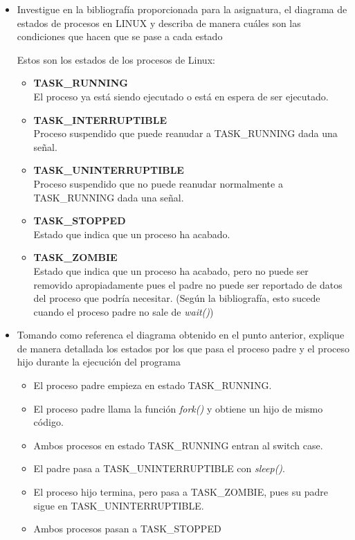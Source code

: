 	\begin{itemize}

		\item Investigue en la bibliografía proporcionada para la asignatura, el diagrama de estados de procesos en LINUX y describa de manera cuáles son las condiciones que hacen que se pase a cada estado
		
	\begin{tcolorbox}
	
	Estos son los estados de los procesos de Linux\cite{o'reilly}:
	\begin{itemize}
	\item \textbf{TASK\_RUNNING}\\
	El proceso ya está siendo ejecutado o está en espera de ser ejecutado.
	\item \textbf{TASK\_INTERRUPTIBLE}\\
	Proceso suspendido que puede reanudar a TASK\_RUNNING dada una señal.
	\item \textbf{TASK\_UNINTERRUPTIBLE}\\
	Proceso suspendido que no puede reanudar normalmente a TASK\_RUNNING dada una señal.
	\item \textbf{TASK\_STOPPED}\\
	Estado que indica que un proceso ha acabado.
	\item \textbf{TASK\_ZOMBIE}\\
	Estado que indica que un proceso ha acabado, pero no puede ser removido apropiadamente pues el padre no puede ser reportado de datos del proceso que podría necesitar. (Según la bibliografía, esto sucede cuando el proceso padre no sale de \textit{wait()})
	\end{itemize}
	\end{tcolorbox}

	\item Tomando como referenca el diagrama obtenido en el punto anterior, explique de manera detallada los estados por los que pasa el proceso padre y el proceso hijo durante la ejecución del programa
		
	\begin{tcolorbox}
	
	\begin{itemize}
	\item El proceso padre empieza en estado TASK\_RUNNING.
	\item El proceso padre llama la función \textit{fork()} y obtiene un hijo de mismo código.
	\item Ambos procesos en estado TASK\_RUNNING entran al switch case.
	\item El padre pasa a TASK\_UNINTERRUPTIBLE con \textit{sleep()}.
	\item El proceso hijo termina, pero pasa a TASK\_ZOMBIE, pues su padre sigue en TASK\_UNINTERRUPTIBLE.
	\item Ambos procesos pasan a TASK\_STOPPED 
	\end{itemize}
	
	\end{tcolorbox}
	
	\end{itemize}

